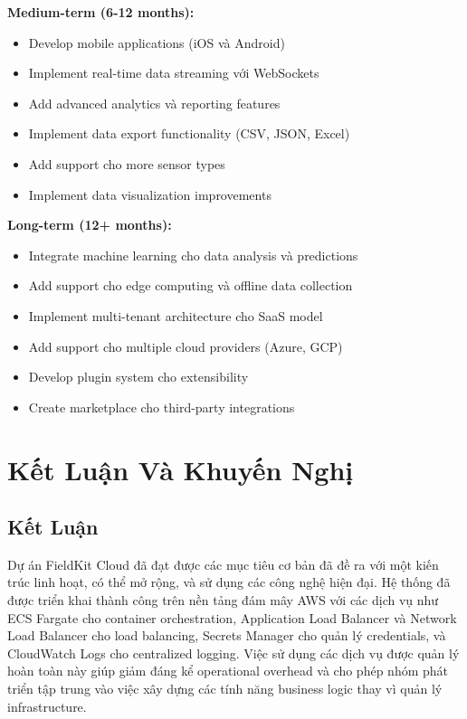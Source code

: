 \textbf{Medium-term (6-12 months):}
\begin{itemize}
    \item Develop mobile applications (iOS và Android)
    \item Implement real-time data streaming với WebSockets
    \item Add advanced analytics và reporting features
    \item Implement data export functionality (CSV, JSON, Excel)
    \item Add support cho more sensor types
    \item Implement data visualization improvements
\end{itemize}

\textbf{Long-term (12+ months):}
\begin{itemize}
    \item Integrate machine learning cho data analysis và predictions
    \item Add support cho edge computing và offline data collection
    \item Implement multi-tenant architecture cho SaaS model
    \item Add support cho multiple cloud providers (Azure, GCP)
    \item Develop plugin system cho extensibility
    \item Create marketplace cho third-party integrations
\end{itemize}

\section{Kết Luận Và Khuyến Nghị}

\subsection{Kết Luận}

Dự án FieldKit Cloud đã đạt được các mục tiêu cơ bản đã đề ra với một kiến trúc linh hoạt, có thể mở rộng, và sử dụng các công nghệ hiện đại. Hệ thống đã được triển khai thành công trên nền tảng đám mây AWS với các dịch vụ như ECS Fargate cho container orchestration, Application Load Balancer và Network Load Balancer cho load balancing, Secrets Manager cho quản lý credentials, và CloudWatch Logs cho centralized logging. Việc sử dụng các dịch vụ được quản lý hoàn toàn này giúp giảm đáng kể operational overhead và cho phép nhóm phát triển tập trung vào việc xây dựng các tính năng business logic thay vì quản lý infrastructure.

